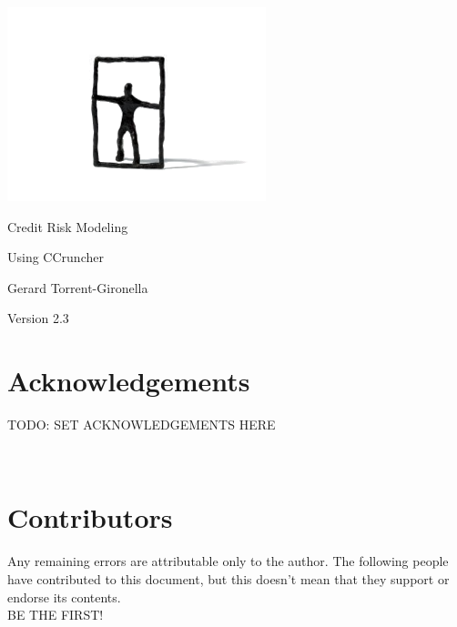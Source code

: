 \documentclass[11pt,fleqn]{book} %
\def\numversion{2.3}
\begin{document}
\begingroup
\thispagestyle{empty}
\vspace*{-1cm}
\centerline{\includegraphics[angle=0]{./Pictures/logo.png}}
\centering
\vspace*{0.5cm}
\par\normalfont\fontsize{35}{35}\sffamily\selectfont
Credit Risk Modeling \par
\par\normalfont\fontsize{25}{25}\sffamily\selectfont
Using CCruncher\par
\vspace*{2cm}
{\huge Gerard Torrent-Gironella}\par
\vspace*{2cm}
\par\normalfont\fontsize{14}{14}\sffamily\selectfont
Version \numversion\par
\endgroup


\newpage

\section*{Acknowledgements}
TODO\@: SET ACKNOWLEDGEMENTS HERE

~\vfill
\section*{Contributors}
Any remaining errors are attributable only to the author.
The following people have contributed to this document, but this doesn't mean 
that they support or endorse its contents. \\
BE THE FIRST!
\end{document}
